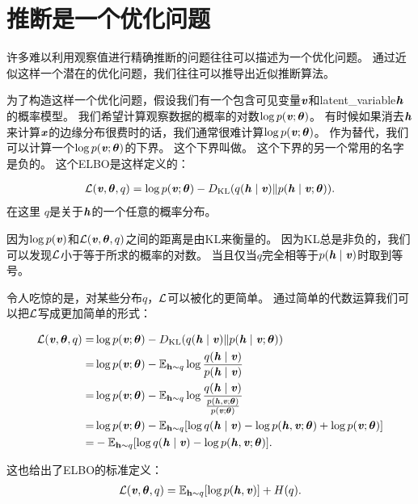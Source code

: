 \section{推断是一个优化问题}
\label{sec:inference_as_optimization}

许多难以利用观察值进行精确推断的问题往往可以描述为一个优化问题。
通过近似这样一个潜在的优化问题，我们往往可以推导出近似推断算法。


为了构造这样一个优化问题，假设我们有一个包含可见变量$\Vv$和\gls{latent_variable}$\Vh$的概率模型。
我们希望计算观察数据的概率的对数$\log p(\Vv;\Vtheta)$。
有时候如果消去$\Vh$来计算$\Vx$的边缘分布很费时的话，我们通常很难计算$\log p(\Vv;\Vtheta)$。
作为替代，我们可以计算一个$\log p(\Vv;\Vtheta)$的下界。
这个下界叫做。
这个下界的另一个常用的名字是负的。
这个\gls{ELBO}是这样定义的：

\begin{align}
\CalL(\Vv,{\Vtheta},q) = \log p(\Vv;{\Vtheta}) - D_{\text{KL}}(q(\Vh\mid\Vv) \Vert p(\Vh\mid\Vv;{\Vtheta})).
\end{align}
在这里 $q$是关于$\Vh$的一个任意的概率分布。


因为$\log p(\Vv)$和$\CalL(\Vv,{\Vtheta},q)$之间的距离是由\gls{KL}来衡量的。
因为\gls{KL}总是非负的，我们可以发现$\CalL$小于等于所求的概率的对数。
当且仅当$q$完全相等于$p(\Vh\mid\Vv)$时取到等号。


令人吃惊的是，对某些分布$q$，$\CalL$可以被化的更简单。
通过简单的代数运算我们可以把$\CalL$写成更加简单的形式：

\begin{align}
\CalL(\Vv,{\Vtheta},q) = & \log p(\Vv;{\Vtheta})- D_{\text{KL}}(q(\Vh\mid\Vv)\Vert p(\Vh\mid\Vv;{\Vtheta})) \\
= & \log p(\Vv;{\Vtheta}) - \SetE_{\RVh\sim q}\log \frac{q(\Vh\mid\Vv)}{p(\Vh\mid\Vv)} \\
= & \log p(\Vv;{\Vtheta}) -  \SetE_{\RVh\sim q} \log \frac{q(\Vh\mid\Vv) }{ \frac{p(\Vh,\Vv;{\Vtheta})}{p(\Vv; {\Vtheta})} } \\
= & \log p(\Vv; {\Vtheta}) -  \SetE_{\RVh\sim q} [\log q(\Vh\mid\Vv) - \log {p(\Vh,\Vv; {\Vtheta})} + \log {p(\Vv; {\Vtheta})} ]\\
= & - \SetE_{\RVh\sim q}[\log q(\Vh\mid\Vv) - \log {p(\Vh,\Vv;{\Vtheta})}].
\end{align}


这也给出了\gls{ELBO}的标准定义：
\begin{align}
\CalL(\Vv,{\Vtheta},q) = \SetE_{\RVh\sim q}[\log p(\Vh , \Vv)] + H(q).
\end{align}


